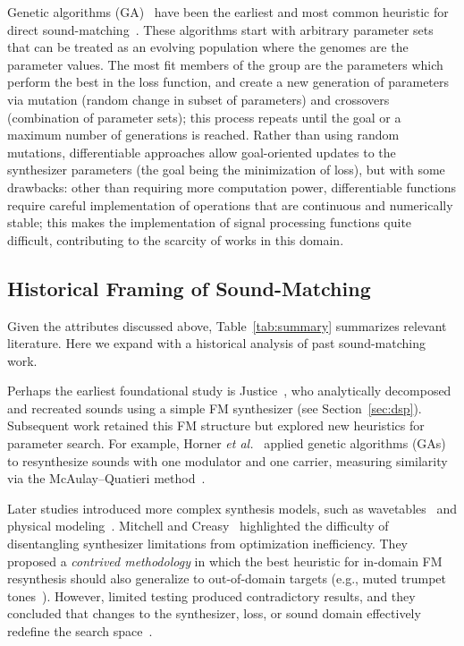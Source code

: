Genetic algorithms (\gls{GA})~\cite{holland1992genetic} have been the earliest and most common heuristic for direct sound-matching~\cite{horner1993machine,mitchell2007evolutionary,yee2018automatic}. These algorithms start with arbitrary parameter sets that can be treated as an evolving population where the genomes are the parameter values. The most fit members of the group are the parameters which perform the best in the loss function, and create a new generation of parameters via mutation (random change in subset of parameters) and crossovers (combination of parameter sets); this process repeats until the goal or a maximum number of generations is reached. Rather than using random mutations, differentiable approaches allow goal-oriented updates to the synthesizer parameters (the goal being the minimization of loss), but with some drawbacks: other than requiring more computation power, differentiable functions require careful implementation of operations that are continuous and numerically stable; this makes the implementation of signal processing functions quite difficult, contributing to the scarcity of works in this domain.

\subsection{Historical Framing of Sound-Matching}
Given the attributes discussed above, Table~\ref{tab:summary} summarizes relevant literature. Here we expand with a historical analysis of past sound-matching work.

Perhaps the earliest foundational study is Justice~\cite{justice1979analytic}, who analytically decomposed and recreated sounds using a simple FM synthesizer (see Section~\ref{sec:dsp}). 
Subsequent work retained this FM structure but explored new heuristics for parameter search. 
For example, Horner \textit{et al.}~\cite{horner1993machine} applied genetic algorithms (GAs) to resynthesize sounds with one modulator and one carrier, measuring similarity via the McAulay–Quatieri method~\cite{mcaulay1986speech}. 


Later studies introduced more complex synthesis models, such as wavetables~\cite{horner2003auto} and physical modeling~\cite{riionheimo2003parameter}. 
Mitchell and Creasy~\cite{mitchell2007evolutionary} highlighted the difficulty of disentangling synthesizer limitations from optimization inefficiency. 
They proposed a \textit{contrived methodology} in which the best heuristic for in-domain FM resynthesis should also generalize to out-of-domain targets (e.g., muted trumpet tones~\cite{opolko1989mcgill}). 
However, limited testing produced contradictory results, and they concluded that changes to the synthesizer, loss, or sound domain effectively redefine the search space~\cite{mitchell2007evolutionary}.

